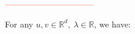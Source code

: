 \documentclass{article}
\begin{document}
\textcolor{red}{--------------------------------}
\begin{comment}

Plugging in $h = \frac{1}{L}$ into $(1)$, the optimal update would be:

\begin{align*}
    &f( y ) = f ( x ) - \frac{1}{2 L} \Vert \nabla f ( x ) \Vert^2 \\
    \Rightarrow \ & f( y ) - f ( x ) = - \frac{1}{2 L} \Vert \nabla f ( x ) \Vert^2 \qquad \text{(plug in } y = x_{t+1}, x = x_t \text{)} \\
    \Rightarrow \ &f ( x_{t + 1} ) - f ( x_t ) = - \frac{1}{2 L} \Vert \nabla f ( x_t ) \Vert^2 
\end{align*}

Thus, to show that $f ( x_{t + 1} ) - f ( x_t ) \leq - \frac{1}{2 L} \Vert \nabla f ( x_t ) \Vert_*^2$ is equivalent to show that:

\begin{align*}
    &- \frac{1}{2 L} \Vert \nabla f ( x_t ) \Vert^2 \leq - \frac{1}{2 L} \Vert \nabla f ( x_t ) \Vert_*^2 \\
    \Rightarrow \ &\Vert \nabla f ( x_t ) \Vert^2 \geq \Vert \nabla f ( x_t ) \Vert_*^2 \\
\end{align*}

By the definition of $\Vert u \Vert_*$:

\begin{align*}
    \Vert u \Vert_* := \underset{x \in \mathbb{R}^d, \Vert x \Vert \leq 1}{\max} \langle u, x \rangle 
\end{align*}

Let $u = \nabla f ( x_t )$, then we have:

\begin{align*}
    \Vert \nabla f ( x_t ) \Vert_* = \underset{x \in \mathbb{R}^d, \Vert x \Vert \leq 1}{\max} \langle \nabla f ( x_t ), x \rangle 
\end{align*}
\end{comment}






For any $u, v \in \mathbb{R}^d, \ \lambda \in \mathbb{R}$, we have:
\end{document}
